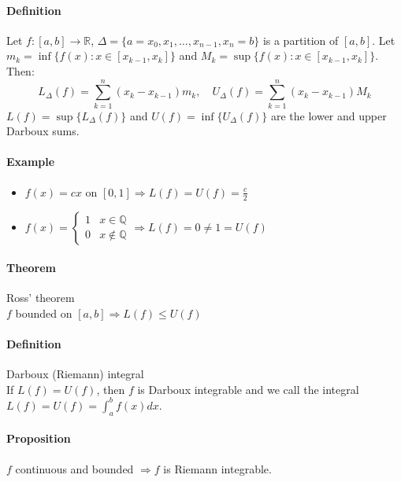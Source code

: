 \documentclass{article}
\newcommand{\functoR}[2]{#1 : #2 \rightarrow \mathbb{R}}
\newcommand{\sumn}[1]{\sum_{k=1}^n #1}
\newcommand{\intcc}[1]{\left[#1\right]}
\newcommand{\Q}{\mathbb{Q}}
\newcommand{\Def}{\paragraph{Definition}}
\newcommand{\Proposition}{\paragraph{Proposition}}
\newcommand{\Theorem}{\paragraph{Theorem}}
\newcommand{\Example}{\paragraph{Example}}
\begin{document}
  \Def Let $\functoR{f}{\intcc{a,b}}$, $\Delta = \{ a = x_0, x_1, \hdots,
  x_{n-1}, x_n = b \}$ is a partition of $\intcc{a,b}$. Let $m_k =
  \inf \{ f(x) : x \in \intcc{x_{k-1},x_k} \}$ and $M_k =
  \sup \{ f(x) : x \in \intcc{x_{k-1},x_k} \}$. Then:
  \begin{equation*}
    L_\Delta(f) = \sumn (x_k - x_{k-1})m_k, \quad
    U_\Delta(f) = \sumn (x_k - x_{k-1})M_k
  \end{equation*}
  $L(f) = \sup \{ L_\Delta(f) \}$ and $U(f) = \inf \{ U_\Delta(f) \}$ are the
  lower and upper Darboux sums.

  \Example
  \begin{itemize}
    \item $f(x) = cx$ on $\intcc{0,1} \Rightarrow L(f) = U(f) = \frac{c}{2}$
    \item $f(x) = \begin{cases}1 & x \in \Q \\ 0 & x \notin \Q\end{cases}
    \Rightarrow L(f) = 0 \neq 1 = U(f)$
  \end{itemize}

  \Theorem Ross' theorem
\\$f$ bounded on $\intcc{a,b} \Rightarrow L(f) \leq U(f)$

  \Def Darboux (Riemann) integral
\\If $L(f) = U(f)$, then $f$ is Darboux integrable and we call the integral
  $L(f) = U(f) = \int_a^b f(x) dx$.

  \Proposition $f$ continuous and bounded $\Rightarrow f$ is Riemann integrable.
\end{document}
